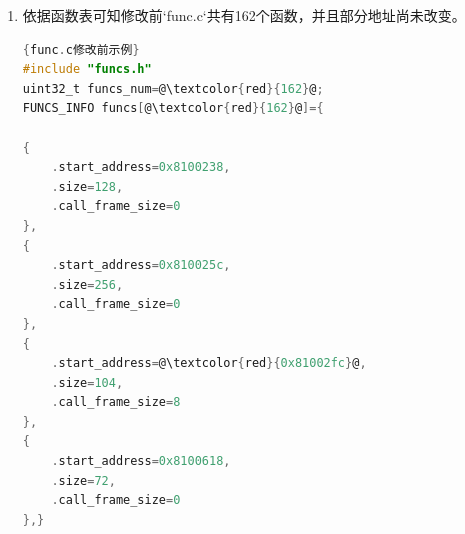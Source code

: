 \documentclass[UTF8,12pt,a4paper]{ctexart}
\numberwithin{figure}{section}
\begin{document}
\begin{enumerate}
\begin{enumerate}
\begin{figure}
                        \label{gl}
                    \end{figure}
              \item 依据函数表可知修改前`func.c`共有162个函数，并且部分地址尚未改变。
                    \begin{lstlisting}[language=C]{func.c修改前示例}
#include "funcs.h"
uint32_t funcs_num=@\textcolor{red}{162}@;
FUNCS_INFO funcs[@\textcolor{red}{162}@]={

{
    .start_address=0x8100238,
    .size=128,
    .call_frame_size=0
},
{
    .start_address=0x810025c,
    .size=256,
    .call_frame_size=0
},
{
    .start_address=@\textcolor{red}{0x81002fc}@,
    .size=104,
    .call_frame_size=8
},
{
    .start_address=0x8100618,
    .size=72,
    .call_frame_size=0
},} \end{lstlisting}
                    

\end{enumerate}
\end{enumerate}
\end{document}
